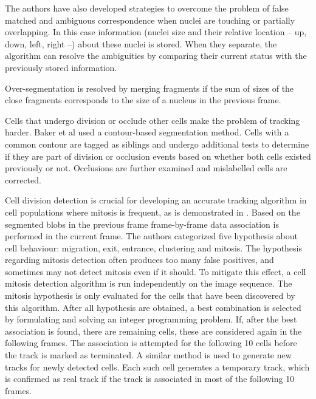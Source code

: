 \documentclass[12pt,a4paper,openany]{book}
\begin{document}
The authors have also developed strategies to overcome the problem of false matched and ambiguous correspondence when nuclei are touching or partially overlapping. In this case information (nuclei size and their relative location -- up, down, left, right --) about these nuclei is stored. When they separate, the algorithm can resolve the ambiguities by comparing their current status with the previously stored information.

Over-segmentation is resolved by merging fragments if the sum of sizes of the close fragments corresponds to the size of a nucleus in the previous frame.

Cells that undergo division or occlude other cells make the problem of tracking harder. Baker et al \cite{baker13} used a contour-based segmentation method. Cells with a common contour are tagged as siblings and undergo additional tests to determine if they are part of division or occlusion events based on whether both cells existed previously or not. Occlusions are further examined and mislabelled cells are corrected.

Cell division detection is crucial for developing an accurate tracking algorithm in cell populations where mitosis is frequent, as is demonstrated in \cite{huh13}. Based on the segmented blobs in the previous frame frame-by-frame data association is performed in the current frame. The authors categorized five hypothesis about cell behaviour: migration, exit, entrance, clustering and mitosis. The hypothesis regarding mitosis detection often produces too many false positives, and sometimes may not detect mitosis even if it should. To mitigate this effect, a cell mitosis detection algorithm is run independently on the image sequence. The mitosis hypothesis is only evaluated for the cells that have been discovered by this algorithm. After all hypothesis are obtained, a best combination is selected by formulating and solving an integer programming problem. If, after the best association is found, there are remaining cells, these are considered again in the following frames. The association is attempted for the following 10 cells before the track is marked as terminated. A similar method is used to generate new tracks for newly detected cells. Each such cell generates a temporary track, which is confirmed as real track if the track is associated in most of the following 10 frames.
\end{document}
